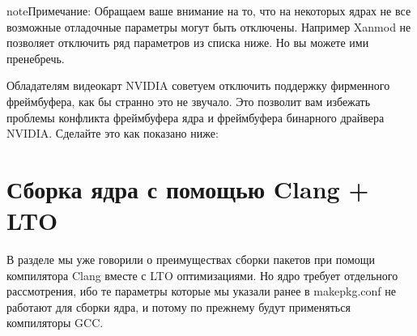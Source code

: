 \documentclass[letterpaper,10pt,russian,openany]{sphinxmanual}
\begin{document}
\begin{sphinxadmonition}{note}{Примечание:}
\sphinxAtStartPar
Обращаем ваше внимание на то, что на некоторых ядрах не все возможные отладочные параметры могут быть отключены.
Например Xanmod не позволяет отключить ряд параметров из списка ниже. Но вы можете ими пренебречь.
\end{sphinxadmonition}

\sphinxAtStartPar
{}

\noindent{}

\sphinxAtStartPar
{}

\noindent{}

\sphinxAtStartPar
{} Обладателям видеокарт NVIDIA советуем отключить поддержку фирменного фреймбуфера, как бы странно это не звучало.
Это позволит вам избежать проблемы конфликта фреймбуфера ядра и фреймбуфера бинарного драйвера NVIDIA. Сделайте это
как показано ниже:

\sphinxAtStartPar
{}

\noindent{}

\sphinxAtStartPar
{}

\noindent{}

\sphinxAtStartPar
{}

\noindent{}

\sphinxAtStartPar
{}

\noindent{}

\sphinxAtStartPar
{}

\noindent{}

\ignorespaces 

\section{Сборка ядра с помощью Clang + LTO}
\label{\detokenize{source/custom-kernels:clang-lto}}\label{\detokenize{source/custom-kernels:kernel-with-clang-lto}}\label{\detokenize{source/custom-kernels:index-7}}
\sphinxAtStartPar
В разделе 
мы уже говорили о преимуществах сборки пакетов при помощи компилятора Clang вместе с LTO оптимизациями.
Но ядро требует отдельного рассмотрения, ибо те параметры которые мы указали ранее в makepkg.conf не работают для сборки ядра,
и потому по прежнему будут применяться компиляторы GCC.
\end{document}
